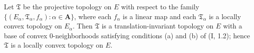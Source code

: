 Let $\mathfrak{T}$ be the projective topology on $E$ with respect to the family $\{(E_\alpha, \mathfrak{T}_\alpha, f_\alpha): \alpha \in \mathbf{A}\}$, where each $f_\alpha$ is a linear map and each $\mathfrak{T}_\alpha$ is a locally convex topology on $E_\alpha$. Then $\mathfrak{T}$ is a translation-invariant topology on $E$ with a base of convex $0$-neighborhoods satisfying conditions (a) and (b) of (I, 1.2); hence $\mathfrak{T}$ is a locally convex topology on $E$.
